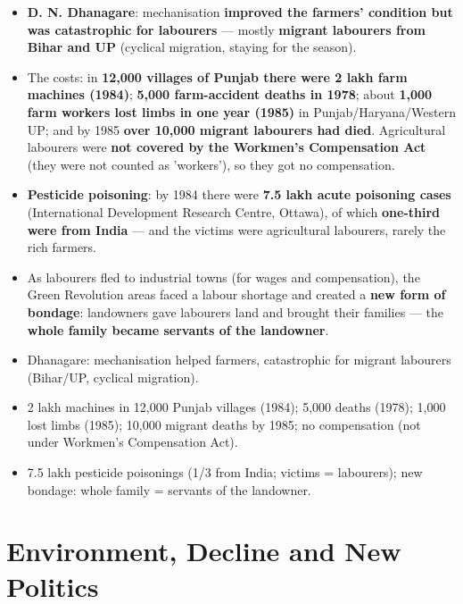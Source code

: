 \begin{KeyConcept}
\begin{itemize}
\item \textbf{D. N. Dhanagare}: mechanisation \textbf{improved the farmers' condition but was catastrophic for labourers} --- mostly \textbf{migrant labourers from Bihar and UP} (cyclical migration, staying for the season).
\item The costs: in \textbf{12,000 villages of Punjab there were 2 lakh farm machines (1984)}; \textbf{5,000 farm-accident deaths in 1978}; about \textbf{1,000 farm workers lost limbs in one year (1985)} in Punjab/Haryana/Western UP; and by 1985 \textbf{over 10,000 migrant labourers had died}. Agricultural labourers were \textbf{not covered by the Workmen's Compensation Act} (they were not counted as 'workers'), so they got no compensation.
\item \textbf{Pesticide poisoning}: by 1984 there were \textbf{7.5 lakh acute poisoning cases} (International Development Research Centre, Ottawa), of which \textbf{one-third were from India} --- and the victims were agricultural labourers, rarely the rich farmers.
\item As labourers fled to industrial towns (for wages and compensation), the Green Revolution areas faced a labour shortage and created a \textbf{new form of bondage}: landowners gave labourers land and brought their families --- the \textbf{whole family became servants of the landowner}.
\end{itemize}
\end{KeyConcept}

\begin{QuickRevision}
\begin{itemize}
\item Dhanagare: mechanisation helped farmers, catastrophic for migrant labourers (Bihar/UP, cyclical migration).
\item 2 lakh machines in 12,000 Punjab villages (1984); 5,000 deaths (1978); 1,000 lost limbs (1985); 10,000 migrant deaths by 1985; no compensation (not under Workmen's Compensation Act).
\item 7.5 lakh pesticide poisonings (1/3 from India; victims = labourers); new bondage: whole family = servants of the landowner.
\end{itemize}
\end{QuickRevision}

\section{Environment, Decline and New Politics}

